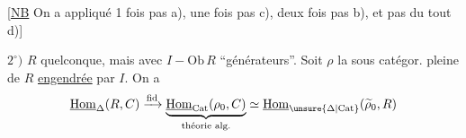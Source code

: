 [\uline{NB} On a appliqué 1 fois pas a), une fois pas c), deux fois pas b), et pas du tout d)]

$2^\circ)$ $R$ quelconque, mais avec $I\mathbin{-}\mathrm{Ob}\,R$ ``générateurs''. Soit $\rho$ la sous catégor. pleine de $R$ \uline{engendrée} par $I$. On a
\[
\underline{\mathrm{Hom}}_{\Delta}(R,C)\xrightarrow{\mathrm{fid}}
\underbrace{\underline{\mathrm{Hom}}_{\mathrm{Cat}}(\rho_0,C)}_{\text{théorie alg.}}
 \simeq\underline{\mathrm{Hom}}_{\unsure{\Delta|\mathrm{Cat}}}(\widetilde\rho_0,R)
\]
